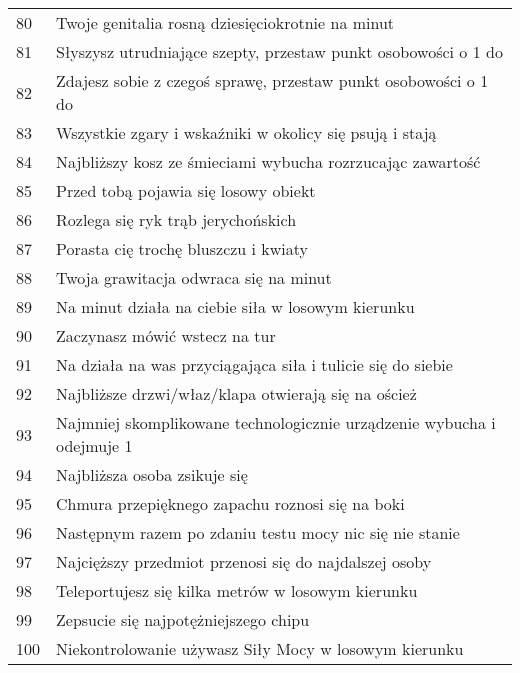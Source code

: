 \begin{longtabu}{ l l }
80			&	Twoje genitalia rosną dziesięciokrotnie na \diiii minut \\
81			&	Słyszysz utrudniające szepty, przestaw punkt osobowości o 1 do \aba \\
82			&	Zdajesz sobie z czegoś sprawę, przestaw punkt osobowości o 1 do \abi \\
83			&	Wszystkie zgary i wskaźniki w okolicy się psują i stają \\
84			&	Najbliższy kosz ze śmieciami wybucha rozrzucając zawartość \\
85			&	Przed tobą pojawia się losowy obiekt \\
86			&	Rozlega się ryk trąb jerychońskich \\
87			&	Porasta cię trochę bluszczu i kwiaty \\
88			&	Twoja grawitacja odwraca się na \diiii minut \\
89			&	Na \diiii minut działa na ciebie siła w losowym kierunku \\
90			&	Zaczynasz mówić wstecz na \diiii tur \\
91			&	Na \dxx działa na was przyciągająca siła i tulicie się do siebie \\
92			&	Najbliższe drzwi/właz/klapa otwierają się na oścież \\
93			&	Najmniej skomplikowane technologicznie urządzenie wybucha i odejmuje 1 \abzyc \\
94			&	Najbliższa osoba zsikuje się \\
95			&	Chmura przepięknego zapachu roznosi się na boki \\
96			&	Następnym razem po zdaniu testu mocy nic się nie stanie \\
97			&	Najcięższy przedmiot przenosi się do najdalszej osoby \\
98			&	Teleportujesz się kilka metrów w losowym kierunku \\
99			&	Zepsucie się najpotężniejszego chipu \\
100			&	Niekontrolowanie używasz Siły Mocy w losowym kierunku \\
\end{longtabu}








